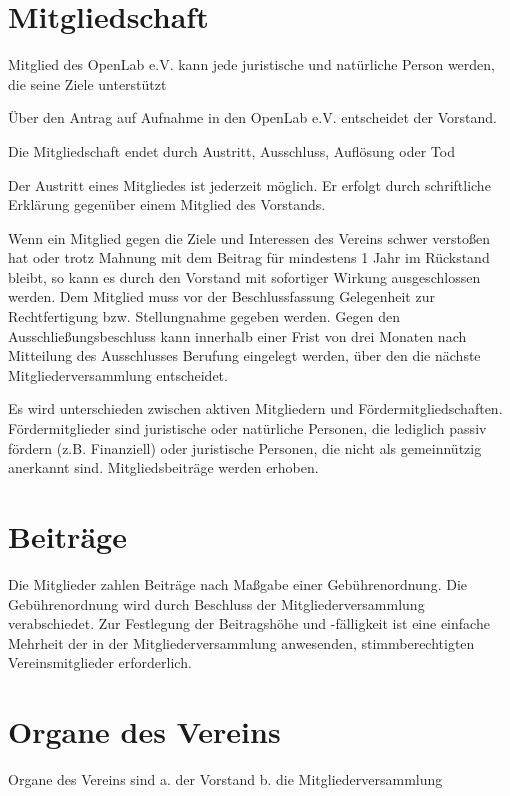 \documentclass[a5paper, ngerman, 10pt]{scrreprt}
\begin{document}
\section{Mitgliedschaft}
\begin{compactenum}[(1)]
    \item Mitglied des OpenLab e.V. kann jede juristische und natürliche Person
        werden, die seine Ziele unterstützt 
    \item Über den Antrag auf Aufnahme in den OpenLab e.V. entscheidet der
        Vorstand. 
    \item Die Mitgliedschaft endet durch Austritt, Ausschluss, Auflösung oder
        Tod 
    \item Der Austritt eines Mitgliedes ist jederzeit möglich. Er erfolgt durch
        schriftliche Erklärung gegenüber einem Mitglied des Vorstands.  
    \item Wenn ein Mitglied gegen die Ziele und Interessen des Vereins schwer
        verstoßen hat oder trotz Mahnung mit dem Beitrag für mindestens 1 Jahr
        im Rückstand bleibt, so kann es durch den Vorstand mit sofortiger
        Wirkung ausgeschlossen werden. Dem Mitglied muss vor der
        Beschlussfassung Gelegenheit zur Rechtfertigung bzw. Stellungnahme
        gegeben werden. Gegen den Ausschließungsbeschluss kann innerhalb einer
        Frist von drei Monaten nach Mitteilung des Ausschlusses Berufung
        eingelegt werden, über den die nächste Mitgliederversammlung
        entscheidet.  
    \item Es wird unterschieden zwischen aktiven Mitgliedern und
        Fördermitgliedschaften.  Fördermitglieder sind juristische oder
        natürliche Personen, die lediglich passiv fördern (z.B. Finanziell)
        oder juristische Personen, die nicht als gemeinnützig anerkannt sind.
        Mitgliedsbeiträge werden erhoben.
\end{compactenum}


\section{Beiträge}
Die Mitglieder zahlen Beiträge nach Maßgabe einer Gebührenordnung. Die
Gebührenordnung wird durch Beschluss der Mitgliederversammlung verabschiedet.
Zur Festlegung der Beitragshöhe und -fälligkeit ist eine einfache Mehrheit der
in der Mitgliederversammlung anwesenden, stimmberechtigten Vereinsmitglieder
erforderlich.


\section{Organe des Vereins}
Organe des Vereins sind a. der Vorstand b. die Mitgliederversammlung
\end{document}
